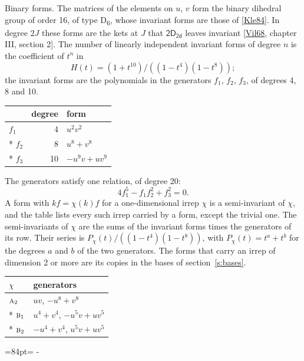 \documentclass[10pt,a4paper]{article}
\makeatletter
\renewcommand\paragraph{\@startsection{paragraph}{4}{\z@}{1.5ex plus .5ex minus .2ex}{-1em}%
  {\normalfont\small\sffamily\bfseries\color{parttitle}}}
\newcommand{\needspace}[1]{\par\penalty-100\begingroup\dimen0=#1\relax\dimen2=\pagegoal
  \advance\dimen2-\pagetotal\ifdim\dimen0>\dimen2\relax\ifdim\dimen2>0pt\vfil\break\fi\fi
  \endgroup}
\numberwithin{equation}{section}
\newcommand{\grp}[1]{\mathsf{#1}}
\newcommand{\irr}[1]{\text{\normalfont\scshape #1}}
\makeatother
\begin{document}
\paragraph{Binary forms.}
The matrices of the elements on $u$, $v$ form the binary dihedral group of order 16, of type D\textsubscript{6}, whose invariant forms are those of [\href{../../../REFERENCES.pdf\#ref.Kle84}{Kle84}]. In degree $2J$ these forms are the kets at $J$ that $\grp{2D_{2d}}$ leaves invariant [\href{../../../REFERENCES.pdf\#ref.Vil68}{Vil68}, chapter III, section 2]. \label{n:head.degree}\label{n:head.form}The number of linearly independent invariant forms of degree $n$ is the coefficient of $t^n$ in
\begin{equation}\label{e:molien}H(t) = (1 + t^{10})/((1-t^{4})(1-t^{8}));\end{equation}
the invariant forms are the polynomials in the generators $f_1$, $f_2$, $f_3$, of degrees 4, 8 and 10.
{\small\begin{longtable}{@{}lrl@{}}\toprule
& degree & form\\\midrule\endhead
\bottomrule\endfoot\endlastfoot
$f_{1}$ & 4 & $u^{2}v^{2}$\\*
$f_{2}$ & 8 & $u^{8} + v^{8}$\\*
$f_{3}$ & 10 & $-u^{9}v + uv^{9}$\\
\bottomrule\end{longtable}}
The generators satisfy one relation, of degree 20:
\begin{equation}\label{e:relation}4f_{1}^{5} - f_{1}f_{2}^{2} + f_{3}^{2} = 0.\end{equation}
A form with $k f = \chi(k) f$ for a one-dimensional irrep $\chi$ is a semi-invariant of $\chi$, and the table lists every such irrep carried by a form, except the trivial one. \label{n:head.generators}The semi-invariants of $\chi$ are the sums of the invariant forms times the generators of its row. Their series is $P_\chi(t)/((1-t^{4})(1-t^{8}))$, with $P_\chi(t) = t^{a} + t^{b}$ for the degrees $a$ and $b$ of the two generators. The forms that carry an irrep of dimension 2 or more are its copies in the bases of section~\ref{s:bases}.
{\small\begin{longtable}{@{}ll@{}}\toprule
$\chi$ & generators\\\midrule\endhead
\bottomrule\endfoot\endlastfoot
$\irr{a}_{2}$ & $uv$, $-u^{8} + v^{8}$\\*
$\irr{b}_{1}$ & $u^{4} + v^{4}$, $-u^{5}v + uv^{5}$\\*
$\irr{b}_{2}$ & $-u^{4} + v^{4}$, $u^{5}v + uv^{5}$\\
\bottomrule\end{longtable}}
\needspace{84pt}
\end{document}
